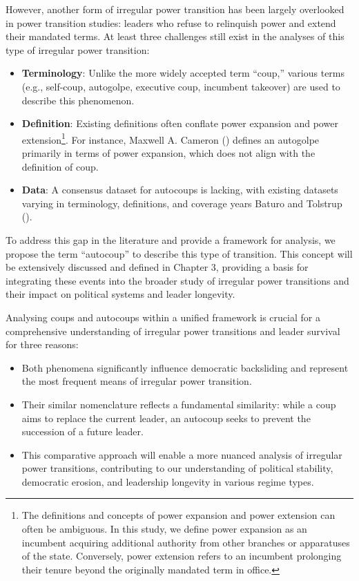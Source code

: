 \documentclass[
  12pt,
]{report}
\providecommand{\tightlist}{%
  \setlength{\itemsep}{0pt}\setlength{\parskip}{0pt}}\usepackage{longtable,booktabs,array}
\begin{document}
However, another form of irregular power transition has been largely
overlooked in power transition studies: leaders who refuse to relinquish
power and extend their mandated terms. At least three challenges still
exist in the analyses of this type of irregular power transition:

\begin{itemize}
\item
  \textbf{Terminology}: Unlike the more widely accepted term ``coup,''
  various terms (e.g., self-coup, autogolpe, executive coup, incumbent
  takeover) are used to describe this phenomenon.
\item
  \textbf{Definition}: Existing definitions often conflate power
  expansion and power extension\footnote{The definitions and concepts of
    power expansion and power extension can often be ambiguous. In this
    study, we define power expansion as an incumbent acquiring
    additional authority from other branches or apparatuses of the
    state. Conversely, power extension refers to an incumbent prolonging
    their tenure beyond the originally mandated term in office.}. For
  instance, Maxwell A. Cameron ()
  defines an autogolpe primarily in terms of power expansion, which does
  not align with the definition of coup.
\item
  \textbf{Data}: A consensus dataset for autocoups is lacking, with
  existing datasets varying in terminology, definitions, and coverage
  years Baturo and Tolstrup ().
\end{itemize}

To address this gap in the literature and provide a framework for
analysis, we propose the term ``autocoup'' to describe this type of
transition. This concept will be extensively discussed and defined in
Chapter 3, providing a basis for integrating these events into the
broader study of irregular power transitions and their impact on
political systems and leader longevity.

Analysing coups and autocoups within a unified framework is crucial for
a comprehensive understanding of irregular power transitions and leader
survival for three reasons:

\begin{itemize}
\tightlist
\item
  Both phenomena significantly influence democratic backsliding and
  represent the most frequent means of irregular power transition.
\item
  Their similar nomenclature reflects a fundamental similarity: while a
  coup aims to replace the current leader, an autocoup seeks to prevent
  the succession of a future leader.
\item
  This comparative approach will enable a more nuanced analysis of
  irregular power transitions, contributing to our understanding of
  political stability, democratic erosion, and leadership longevity in
  various regime types.
\end{itemize}
\end{document}
